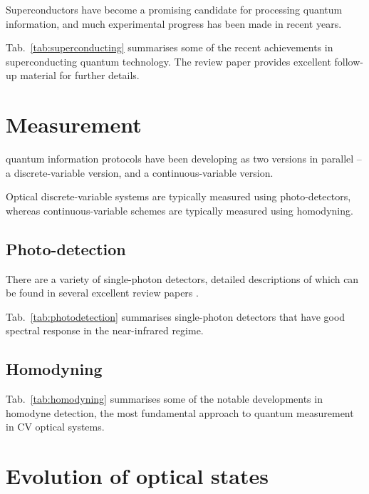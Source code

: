 Superconductors have become a promising candidate for processing quantum information, and much experimental progress has been made in recent years.

Tab.~\ref{tab:superconducting} summarises some of the recent achievements in superconducting quantum technology. The review paper \cite{bib:xiang2013hybrid} provides excellent follow-up material for further details.

%
%

\section{Measurement} 

 quantum information protocols have been developing as two versions in parallel -- a discrete-variable version, and a continuous-variable version.

Optical discrete-variable systems are typically measured using photo-detectors, whereas continuous-variable schemes are typically measured using homodyning.

%
%

\subsection{Photo-detection} 

There are a variety of single-photon detectors, detailed descriptions of which can be found in several excellent review papers \cite{bib:eisaman2011, bib:hadfield2009}.

Tab.~\ref{tab:photodetection} summarises single-photon detectors that have good spectral response in the near-infrared regime.

%
%

\subsection{Homodyning}

Tab.~\ref{tab:homodyning} summarises some of the notable developments in homodyne detection, the most fundamental approach to quantum measurement in CV optical systems.

%
%

\section{Evolution of optical states}  \label{sec:LO_evolution}

